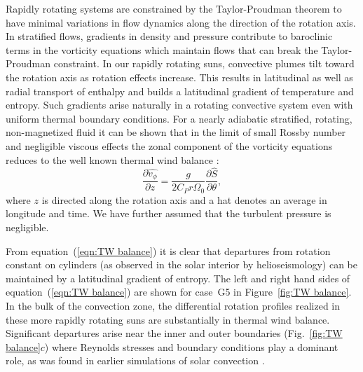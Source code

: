 Rapidly rotating systems are constrained by the Taylor-Proudman theorem
to have minimal variations in flow dynamics along the direction of the
rotation axis.  In stratified flows, gradients in density and pressure
contribute to baroclinic terms in the vorticity equations
\citep{Pedlosky_1987, Zahn_1992} which maintain flows that can break the
Taylor-Proudman constraint.  In our rapidly rotating suns, convective
plumes tilt toward the rotation axis as rotation effects
increase.  This results in latitudinal as well as radial transport of
enthalpy and builds a latitudinal gradient of temperature and entropy.
Such gradients arise naturally in a rotating convective system even
with uniform thermal boundary conditions.
For a nearly adiabatic stratified, rotating, non-magnetized fluid it
can be shown that in the limit of small Rossby number and negligible
viscous effects the zonal component of the vorticity equations reduces
to the well known thermal wind balance
\citep[e.g.,][]{Brun&Toomre_2002, Miesch_et_al_2006}: 
\begin{equation}
  \frac{\partial \widehat{v_\phi}}{\partial z} = \frac{g}{2 C_P r
  \Omega_0}\frac{\partial \widehat{S}}{\partial \theta} ,
  \label{eqn:TW balance}
\end{equation}
where $z$ is directed along the rotation axis and a hat denotes an
average in longitude and time.  We have further
assumed that the turbulent pressure is negligible.

From equation~(\ref{eqn:TW balance}) it is clear that departures from
rotation constant on cylinders (as observed in the solar interior by
helioseismology) can be maintained by a latitudinal gradient of
entropy.  The left and right hand sides of equation~(\ref{eqn:TW
balance}) are shown for case~G5 in Figure~\ref{fig:TW balance}.  In
the bulk of the convection zone, the differential rotation profiles
realized in these more rapidly rotating suns are substantially in
thermal wind balance.  Significant departures arise near the inner and
outer boundaries (Fig.~\ref{fig:TW balance}$c$) 
where Reynolds stresses and boundary conditions play
a dominant role, as was found in earlier simulations of solar
convection \citep{Brun&Toomre_2002}.

\clearpage


